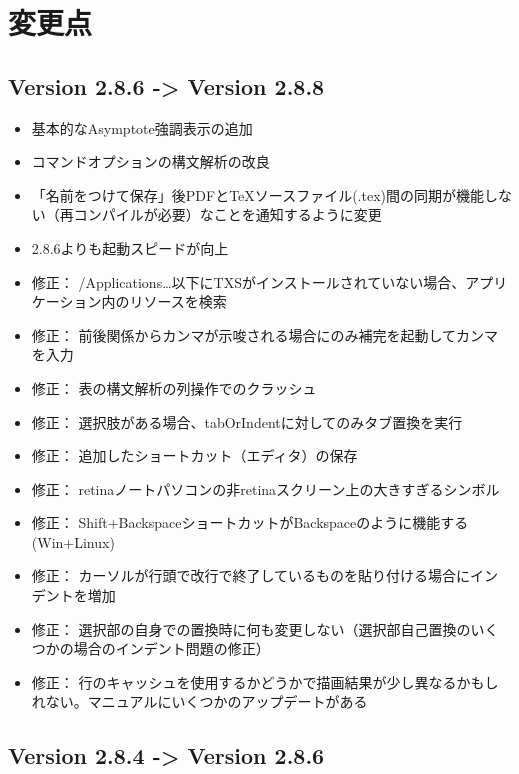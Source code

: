 \chapter{変更点}

\section{Version 2.8.6 -\textgreater{} Version 2.8.8}

\begin{itemize}
\item
  基本的なAsymptote強調表示の追加
\item
  コマンドオプションの構文解析の改良
\item
  「名前をつけて保存」後PDFとTeXソースファイル(.tex)間の同期が機能しない（再コンパイルが必要）なことを通知するように変更
\item
  2.8.6よりも起動スピードが向上
\item
  修正：
  /Applications\ldots{}以下にTXSがインストールされていない場合、アプリケーション内のリソースを検索
\item
  修正：
  前後関係からカンマが示唆される場合にのみ補完を起動してカンマを入力
\item
  修正： 表の構文解析の列操作でのクラッシュ
\item
  修正： 選択肢がある場合、tabOrIndentに対してのみタブ置換を実行
\item
  修正： 追加したショートカット（エディタ）の保存
\item
  修正： retinaノートパソコンの非retinaスクリーン上の大きすぎるシンボル
\item
  修正：
  Shift+BackspaceショートカットがBackspaceのように機能する(Win+Linux)
\item
  修正：
  カーソルが行頭で改行で終了しているものを貼り付ける場合にインデントを増加
\item
  修正：
  選択部の自身での置換時に何も変更しない（選択部自己置換のいくつかの場合のインデント問題の修正）
\item
  修正：
  行のキャッシュを使用するかどうかで描画結果が少し異なるかもしれない。マニュアルにいくつかのアップデートがある
\end{itemize}

\section{Version 2.8.4 -\textgreater{} Version 2.8.6}


